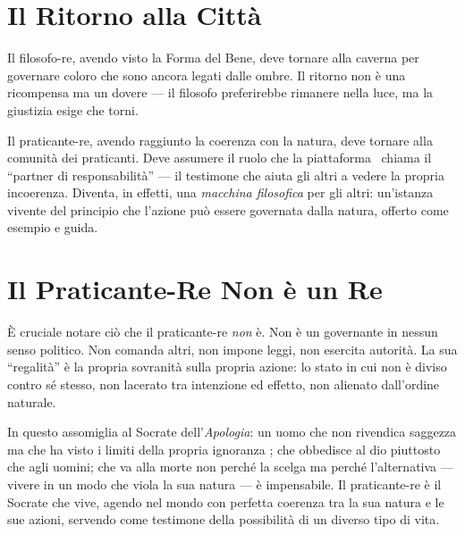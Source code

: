 \section{Il Ritorno alla Citt\`a}

Il filosofo-re, avendo visto la Forma del Bene, deve tornare alla caverna
per governare coloro che sono ancora legati dalle ombre. Il ritorno non
\`e una ricompensa ma un dovere --- il filosofo preferirebbe rimanere
nella luce, ma la giustizia esige che torni.

Il praticante-re, avendo raggiunto la coerenza con la natura, deve
tornare alla comunit\`a dei praticanti. Deve assumere il ruolo che la
piattaforma \praxis\ chiama il ``partner di responsabilit\`a'' --- il
testimone che aiuta gli altri a vedere la propria incoerenza. Diventa,
in effetti, una \emph{macchina filosofica} per gli altri: un'istanza
vivente del principio che l'azione pu\`o essere governata dalla natura,
offerto come esempio e guida.

\section{Il Praticante-Re Non \`e un Re}

\`E cruciale notare ci\`o che il praticante-re \emph{non} \`e. Non
\`e un governante in nessun senso politico. Non comanda altri, non
impone leggi, non esercita autorit\`a. La sua ``regalit\`a'' \`e la
propria sovranit\`a sulla propria azione: lo stato in cui non \`e
diviso contro s\'e stesso, non lacerato tra intenzione ed effetto, non
alienato dall'ordine naturale.

In questo assomiglia al Socrate dell'\emph{Apologia}: un uomo che non
rivendica saggezza ma che ha visto i limiti della propria ignoranza
\parencite{plato1997complete}; che obbedisce al dio piuttosto che agli
uomini; che va alla morte non perch\'e la scelga ma perch\'e
l'alternativa --- vivere in un modo che viola la sua natura --- \`e
impensabile. Il praticante-re \`e il Socrate che vive, agendo nel mondo
con perfetta coerenza tra la sua natura e le sue azioni, servendo come
testimone della possibilit\`a di un diverso tipo di vita.
